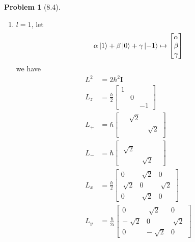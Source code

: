 \documentclass[twoside,11pt]{article}
\theoremstyle{definition}
\newtheorem{problem}{Problem}
\theoremstyle{remark}
\begin{document}
\begin{problem}[8.4]
\begin{enumerate}[label=Case \arabic*., leftmargin=*]
\item $l=1$, let
\begin{align*}
    \alpha\ket{1} + \beta\ket{0} + \gamma\ket{-1}\mapsto
    \begin{bmatrix}
        \alpha\\ \beta\\ \gamma
    \end{bmatrix}
\end{align*}
we have
\begin{align*}
    L^2 &= 2\hbar^2\mathbf{I}\\
    L_z &= \frac{\hbar}{2}\begin{bmatrix}
        1 & & \\
        & 0 & \\
        & & -1
    \end{bmatrix}\\
    L_+ &= \hbar\begin{bmatrix}
        & \sqrt[]{2} & \\
        & & \sqrt[]{2}\\
        & & 
    \end{bmatrix}\\
    L_- &= \hbar\begin{bmatrix}
        & & \\
        \sqrt[]{2} & & \\
        & \sqrt[]{2} & 
    \end{bmatrix}\\
    L_x &= \frac{\hbar}{2}\begin{bmatrix}
        0 & \sqrt[]{2} & 0\\
        \sqrt[]{2} & 0 & \sqrt[]{2}\\
        0 & \sqrt[]{2} & 0
    \end{bmatrix}\\
    L_y &= \frac{\hbar}{2i}\begin{bmatrix}
        0 & \sqrt[]{2} & 0\\
        -\sqrt[]{2} & 0 & \sqrt[]{2}\\
        0 & -\sqrt[]{2} & 0
    \end{bmatrix}
\end{align*}



\end{enumerate}
\end{problem}
\end{document}
